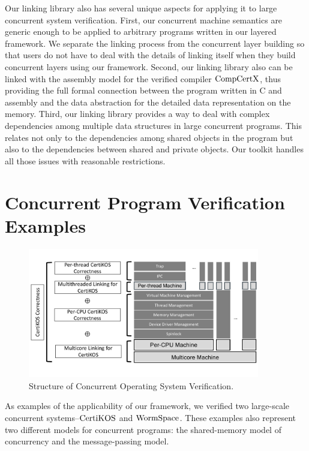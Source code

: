 Our linking library also has several unique aspects for applying it to large concurrent system verification. 
First, our concurrent machine semantics are generic enough to be applied to arbitrary programs written in our layered framework.
We separate the linking process from the concurrent layer building so that users do not have to deal with the details of linking itself when they build concurrent layers using our framework. 
Second, our linking library also can be linked with the assembly model for the verified compiler $\mathrm{CompCertX}$, thus providing the full formal connection between the program written in C and assembly and the data abstraction for the detailed data representation on the memory. 
Third, our linking library provides a way to deal with complex dependencies among multiple data structures in large concurrent programs. 
This relates not only to the dependencies among shared objects in the program but also to the dependencies between shared and private objects. 
Our toolkit handles all those issues with reasonable restrictions. 

\section{Concurrent Program Verification Examples}
\label{chapter:introduction:sec:concurrent-program-verification-examples}


\begin{figure}
\begin{center}
\includegraphics[width=0.9\textwidth, page=1]{figs/intro}
\end{center}
\caption{Structure of Concurrent Operating System Verification.}
\label{fig:intro:certikos-structure}
\end{figure}


As examples of the applicability of our framework, we verified two large-scale concurrent systems--$\mathrm{CertiKOS}$ and $\mathrm{WormSpace}$. 
These examples also represent two different models for concurrent programs: the shared-memory 
model of concurrency and the message-passing model. 

